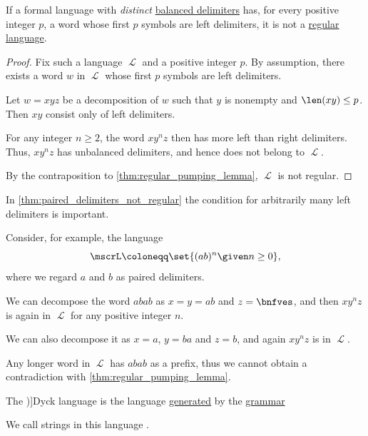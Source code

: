 \begin{proposition}\label{thm:paired_delimiters_not_regular}
  If a formal language with \emph{distinct} \hyperref[def:paired_delimiters]{balanced delimiters} has, for every positive integer \( p \), a word whose first \( p \) symbols are left delimiters, it is not a \hyperref[def:chomsky_hierarchy/regular]{regular language}.
\end{proposition}
\begin{proof}
  Fix such a language \( \mscrL \) and a positive integer \( p \). By assumption, there exists a word \( w \) in \( \mscrL \) whose first \( p \) symbols are left delimiters.

  Let \( w = x y z \) be a decomposition of \( w \) such that \( y \) is nonempty and \( \len(xy) \leq p \). Then \( xy \) consist only of left delimiters.

  For any integer \( n \geq 2 \), the word \( x y^n z \) then has more left than right delimiters. Thus, \( x y^n z \) has unbalanced delimiters, and hence does not belong to \( \mscrL \).

  By the contraposition to \cref{thm:regular_pumping_lemma}, \( \mscrL \) is not regular.
\end{proof}

\begin{example}\label{ex:thm:paired_delimiters_not_regular}
  In \cref{thm:paired_delimiters_not_regular} the condition for arbitrarily many left delimiters is important.

  Consider, for example, the language
  \begin{equation*}
    \mscrL \coloneqq \set{ (ab)^n \given n \geq 0 },
  \end{equation*}
  where we regard \( a \) and \( b \) as paired delimiters.

  We can decompose the word \( abab \) as \( x = y = ab \) and \( z = \bnfves \), and then \( xy^n z \) is again in \( \mscrL \) for any positive integer \( n \).

  We can also decompose it as \( x = a \), \( y = ba \) and \( z = b \), and again \( xy^n z \) is in \( \mscrL \).

  Any longer word in \( \mscrL \) has \( abab \) as a prefix, thus we cannot obtain a contradiction with \cref{thm:regular_pumping_lemma}.
\end{example}

\begin{definition}\label{def:dyck_language}
  The \term[ru=язык Дика (\cite[213]{Гладкий1973ГрамматикиИЯзыки})]{Dyck language} is the language \hyperref[def:formal_grammar/language]{generated} by the \hyperref[def:formal_grammar]{grammar}
  \begin{bnf*}
     {\bnftsq{(} \bnfsp {} \bnfsp \bnftsq{)} \bnfor {} \bnfsp {} \bnfor \varepsilon}
  \end{bnf*}

  We call strings in this language .
\end{definition}

